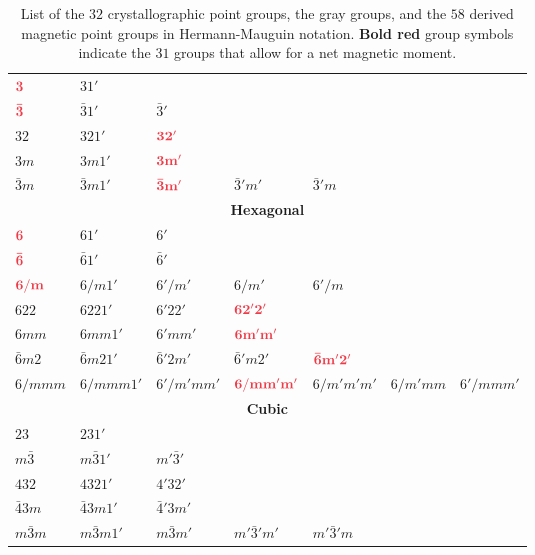 \begin{table}[t!]
{\begin{tabular}{|l|l|lllll|}
\hline 
${\color{OCScotsRose}\mathbf{3}}$ & $31'$ &  & &  & & \\
${\color{OCScotsRose}\mathbf{\bar{3}}}$ & $\bar{3}1'$ &  $\bar{3}'$ &  & & & \\
$32$ & $321'$ &  ${\color{OCScotsRose}\mathbf{32'}}$ &  & &  &\\
$3m$ & $3m1'$ &  ${\color{OCScotsRose}\mathbf{3m'}}$ &  & & & \\
$\bar{3}m$ & $\bar{3}m1'$ &  ${\color{OCScotsRose}\mathbf{\bar{3}m'}}$ & $\bar{3}'m'$ & $\bar{3}'m$ & & \\
\hline
\multicolumn{7}{|c|}{\textbf{Hexagonal}}\\
\hline 
${\color{OCScotsRose}\mathbf{6}}$ & $61'$ &  $6'$ &  & & & \\
${\color{OCScotsRose}\mathbf{\bar{6}}}$  & $\bar{6}1'$  & $\bar{6}'$ &  & & & \\
${\color{OCScotsRose}\mathbf{6/m}}$ & $6/m1'$ &  $6'/m'$ & $6/m'$ & $6'/m$ & & \\
$622$ & $6221'$ & $6'22'$ & ${\color{OCScotsRose}\mathbf{62'2'}}$ &  & & \\
$6mm$ & $6mm1'$ & $6'mm'$ & ${\color{OCScotsRose}\mathbf{6m'm'}}$ &  & & \\
$\bar{6}m2$ & $\bar{6}m21'$ & $\bar{6}'2m'$ &$\bar{6}'m2'$ & ${\color{OCScotsRose}\mathbf{\bar{6}m'2'}}$ & & \\
$6/mmm$  & $6/mmm1'$  & $6'/m'mm'$ &${\color{OCScotsRose}\mathbf{6/mm'm'}}$ & $6/m'm'm'$ & $6/m'mm$ & $6'/mmm'$ \\
\hline
\multicolumn{7}{|c|}{\textbf{Cubic}}\\
\hline 
$23$ &$231'$ &  & &  & & \\
$m\bar{3}$ & $m\bar{3}1'$ & $m'\bar{3}'$ & &  & & \\
$432$ & $4321'$ & $4'32'$ & &  & & \\
$\bar{4}3m$ & $\bar{4}3m1'$ & $\bar{4}'3m'$ & &  & & \\
$m\bar{3}m$ & $m\bar{3}m1'$ & $m\bar{3}m'$ & $m'\bar{3}'m'$ & $m'\bar{3}'m$ & & \\
\hline
\end{tabular}
}
\caption{\label{\chabbr:tb:MPGs}List of the $32$ crystallographic point groups,  the gray groups,  and the $58$ derived magnetic point groups in Hermann-Mauguin notation. 
{\color{OCScotsRose}\textbf{Bold red}} group symbols indicate the $31$ groups that allow for a net magnetic moment. }
\end{table}


